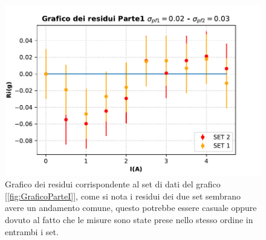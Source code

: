 {\begin{figure}[H]
  \centering
  \includegraphics[width=13.5cm]{Figures/Residui_Parte1.pdf}
  \caption{Grafico dei residui corrispondente al set di dati del grafico [\ref{fig:GraficoParteI}], come si nota i residui dei due set sembrano avere un andamento comune, questo potrebbe essere  casuale oppure dovuto al fatto che le misure sono state prese nello stesso ordine in entrambi i set.}   
  \label{fig:GraficoResiduiParteI}
\end{figure}
\par}